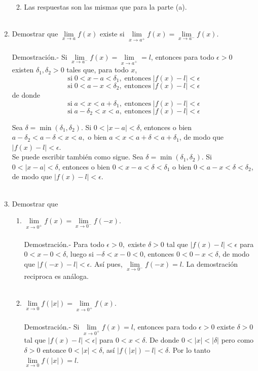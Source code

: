 \begin{enumerate}
\begin{enumerate}[\bfseries (a)]
\begin{enumerate}[\bfseries (i)]
\end{enumerate}

    \item Las respuestas son las mismas que para la parte (a).\\\\

\end{enumerate}

\item Demostrar que $\lim\limits_{x\to a} f(x)$ existe si $\lim\limits_{x\to a^+} f(x) = \lim\limits_{x\to a^-} f(x)$.\\\\
    Demostración.-\; Si $\lim\limits_{x\to a^-}f(x) = \lim\limits_{x\to a^+} = l$, entonces para todo $\epsilon>0$ existen $\delta_1,\delta_2 >0$ tales que, para todo $x$, $$\mbox{si}\; 0<x-a<\delta_1, \; \mbox{entonces}\; |f(x)-l|<\epsilon$$  $$\mbox{si}\; 0 <a-x<\delta_2, \; \mbox{entonces}\; |f(x)-l|<\epsilon$$
    de donde 
    $$\mbox{si}\; a<x<a+\delta_1, \; \mbox{entonces}\; |f(x)-l|<\epsilon$$  $$\mbox{si}\; a-\delta_2 <x<a, \; \mbox{entonces}\; |f(x)-l|<\epsilon$$

    Sea $\delta=\min(\delta_1,\delta_2).$ Si $0<|x-a|<\delta$, entonces o bien $a-\delta_2<a-\delta<x<a,$ o bien $a<x<a+\delta<a+\delta_1$, de modo que $|f(x)-l|<\epsilon$.\\
    Se puede escribir también como sigue. Sea $\delta=\min(\delta_1,\delta_2).$ Si $0<|x-a|<\delta$, entonces o bien $0<x-a<\delta < \delta_1$ o bien $0<a-x<\delta<\delta_2$, de modo que $|f(x)-l|<\epsilon$.\\\\


\item Demostrar que 
\begin{enumerate}[\bfseries (i)]

    \item $\lim\limits_{x\to 0^+}f(x) = \lim\limits_{x\to 0^-} f(-x)$.\\\\
	Demostración.-\; Para todo $\epsilon > 0,$ existe $\delta >0$ tal que $|f(x)-l|<\epsilon$ para $0<x-0<\delta$, luego si $-\delta <x-0<0$, entonces $0<0-x<\delta$, de modo que $|f(-x)-l|<\epsilon$. Así pues, $\lim\limits_{x\to 0^-}f(-x) = l$. La demostración reciproca es análoga.\\\\ 

    \item $\lim\limits_{x\to 0}f(|x|) = \lim\limits_{x\to 0^+}f(x)$.\\\\
	Demostración.-\; Si $\lim\limits_{x\to 0^+} f(x)=l$, entonces para todo $\epsilon>0$ existe $\delta>0$ tal que $|f(x)-l|<\epsilon|$ para $0<x<\delta$. De donde $0<|x|<|\delta|$ pero como $\delta>0$ entonce $0<|x|<\delta$, así $|f(|x|)-l|<\delta$. Por lo tanto $\lim\limits_{x\to 0} f(|x|)=l$.\\\\


\end{enumerate}
\end{enumerate}
